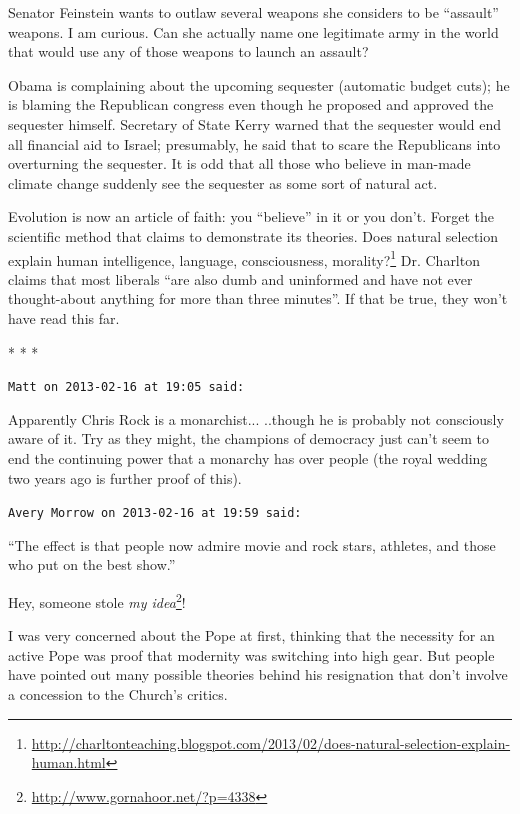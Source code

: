 Senator Feinstein wants to outlaw several weapons she considers to be ``assault'' weapons. I am curious. Can she actually name one legitimate army in the world that would use any of those weapons to launch an assault?

Obama is complaining about the upcoming sequester (automatic budget cuts); he is blaming the Republican congress even though he proposed and approved the sequester himself. Secretary of State Kerry warned that the sequester would end all financial aid to Israel; presumably, he said that to scare the Republicans into overturning the sequester. It is odd that all those who believe in man-made climate change suddenly see the sequester as some sort of natural act.

Evolution is now an article of faith: you ``believe'' in it or you don't. Forget the scientific method that claims to demonstrate its theories. Does natural selection explain human intelligence, language, consciousness, morality?\footnote{\url{http://charltonteaching.blogspot.com/2013/02/does-natural-selection-explain-human.html}} Dr. Charlton claims that most liberals ``are also dumb and uninformed and have not ever thought-about anything for more than three minutes''. If that be true, they won't have read this far.



\begin{center}* * *\end{center}

\begin{footnotesize}
\begin{sffamily}
\texttt{Matt on 2013-02-16 at 19:05 said:}

Apparently Chris Rock is a monarchist... ..though he is probably not consciously aware of it. Try as they might, the champions of democracy just can't seem to end the continuing power that a monarchy has over people (the royal wedding two years ago is further proof of this).

\hfill

\texttt{Avery Morrow on 2013-02-16 at 19:59 said:}

``The effect is that people now admire movie and rock stars, athletes, and those who put on the best show.''

Hey, someone stole \textit{my idea}\footnote{\url{http://www.gornahoor.net/?p=4338}}!

I was very concerned about the Pope at first, thinking that the necessity for an active Pope was proof that modernity was switching into high gear. But people have pointed out many possible theories behind his resignation that don't involve a concession to the Church's critics.


\hfill

\end{sffamily}
\end{footnotesize}

